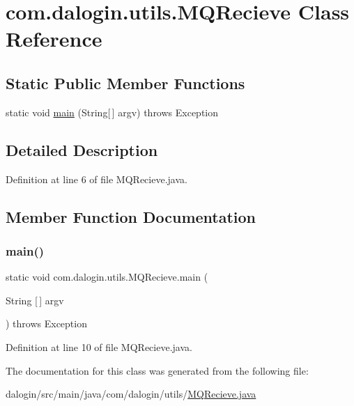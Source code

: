 \hypertarget{classcom_1_1dalogin_1_1utils_1_1_m_q_recieve}{}\section{com.\+dalogin.\+utils.\+M\+Q\+Recieve Class Reference}
\label{classcom_1_1dalogin_1_1utils_1_1_m_q_recieve}
\subsection*{Static Public Member Functions}
\begin{DoxyCompactItemize}
\item 
static void \hyperlink{classcom_1_1dalogin_1_1utils_1_1_m_q_recieve_af0047cc5fd683de5520180079644c66c}{main} (String\mbox{[}$\,$\mbox{]} argv)  throws Exception 
\end{DoxyCompactItemize}


\subsection{Detailed Description}


Definition at line 6 of file M\+Q\+Recieve.\+java.



\subsection{Member Function Documentation}
\mbox{\label{classcom_1_1dalogin_1_1utils_1_1_m_q_recieve_af0047cc5fd683de5520180079644c66c}} 
\subsubsection{\texorpdfstring{main()}{main()}}
{\footnotesize\ttfamily static void com.\+dalogin.\+utils.\+M\+Q\+Recieve.\+main (\begin{DoxyParamCaption}\item[{String \mbox{[}$\,$\mbox{]}}]{argv }\end{DoxyParamCaption}) throws Exception\hspace{0.3cm}{\ttfamily [static]}}



Definition at line 10 of file M\+Q\+Recieve.\+java.



The documentation for this class was generated from the following file\+:\begin{DoxyCompactItemize}
\item 
dalogin/src/main/java/com/dalogin/utils/\hyperlink{_m_q_recieve_8java}{M\+Q\+Recieve.\+java}\end{DoxyCompactItemize}
